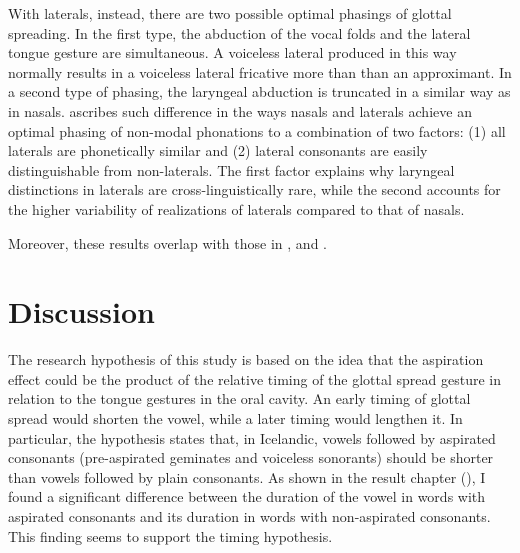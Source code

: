 \documentclass[11pt,a4paper,openany]{memoir}\usepackage[]{graphicx}\usepackage[]{color}
\begin{document}
With laterals, instead, there are two possible optimal phasings of glottal spreading.
In the first type, the abduction of the vocal folds and the lateral tongue gesture are simultaneous.
A voiceless lateral produced in this way normally results in a voiceless lateral fricative more than than an approximant.
In a second type of phasing, the laryngeal abduction is truncated in a similar way as in nasals.
\citet{silverman1997} ascribes such difference in the ways nasals and laterals achieve an optimal phasing of non-modal phonations to a combination of two factors: (1) all laterals are phonetically similar and (2) lateral consonants are easily distinguishable from non-laterals.
The first factor explains why laryngeal distinctions in laterals are cross-linguistically rare, while the second accounts for the higher variability of realizations of laterals compared to that of nasals.


Moreover, these results overlap with those in \citet{jessen1998}, \citet{bombien2006} and \citet{silverman2012}.







\chapter{Discussion}


The research hypothesis of this study is based on the idea that the aspiration effect could be the product of the relative timing of the glottal spread gesture in relation to the tongue gestures in the oral cavity.
An early timing of glottal spread would shorten the vowel, while a later timing would lengthen it.
In particular, the hypothesis states that, in Icelandic, vowels followed by aspirated consonants (pre-aspirated geminates and voiceless sonorants) should be shorter than vowels followed by plain consonants.
As shown in the result chapter (), I found a significant difference between the duration of the vowel in words with aspirated consonants and its duration in words with non-aspirated consonants.
This finding seems to support the timing hypothesis.
\end{document}
